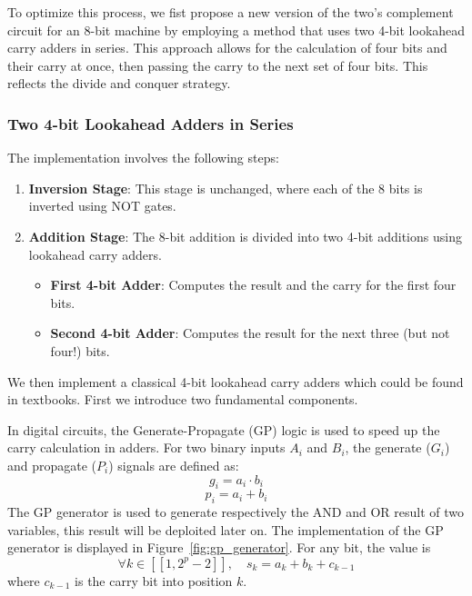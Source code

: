 \documentclass[conference]{IEEEtran}
\begin{document}
To optimize this process, we fist propose a new version of the two's complement circuit for an 8-bit machine by employing a method that uses two 4-bit lookahead carry adders in series. This approach allows for the calculation of four bits and their carry at once, then passing the carry to the next set of four bits. This reflects the divide and conquer strategy.

\subsubsection{Two 4-bit Lookahead Adders in Series}\label{sec:3-A}

The implementation involves the following steps:
\begin{enumerate}
    \item \textbf{Inversion Stage}: This stage is unchanged, where each of the 8 bits is inverted using NOT gates.
    \item \textbf{Addition Stage}: The 8-bit addition is divided into two 4-bit additions using lookahead carry adders.
    \begin{itemize}
        \item \textbf{First 4-bit Adder}: Computes the result and the carry for the first four bits.
        \item \textbf{Second 4-bit Adder}: Computes the result for the next three (but not four!) bits.
    \end{itemize}
\end{enumerate}

We then implement a classical 4-bit lookahead carry adders which could be found in textbooks. First we introduce two fundamental components.

In digital circuits, the Generate-Propagate (GP) logic is used to speed up the carry calculation in adders. For two binary inputs $A_i$ and $B_i$, the generate ($G_i$) and propagate ($P_i$) signals are defined as:
\begin{equation}
g_i = a_i \cdot b_i
\end{equation}
\begin{equation}
p_i = a_i + b_i
\end{equation}
The GP generator is used to generate respectively the AND and OR result of two variables, this result will be deploited later on.
The implementation of the GP generator is displayed in Figure~\ref{fig:gp_generator}. For any bit, the value is 
\begin{equation}
    \forall k \in [\![1, 2^p-2]\!], \quad s_k = a_k + b_k + c_{k-1}
\end{equation}
where $c_{k-1}$ is the carry bit into position $k$.
\end{document}

